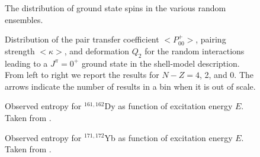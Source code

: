 \documentclass[preprint,rmp,aps,floatfix]{revtex4}
\begin{document}
\begin{figure}
\caption{The distribution of ground state spins in the various
random ensembles.}
\label{fig:j0s}
\end{figure}

\begin{figure}
\caption{Distribution of the pair transfer coefficient $<\!\!P^+_{00}\!\!>$,
pairing strength $<\!\!\kappa\!\!>$, and deformation $Q_2$ for the random 
interactions
leading to a $J^\pi=0^+$ ground state in the shell-model description.
From left to right we report the results for $N-Z=4$, 2, and 0. The arrows
indicate the number of results in a bin when it is out of scale.}
\label{kfig4}
\end{figure}

\begin{figure}
\caption{Observed entropy for $^{161,162}$Dy as 
function of excitation energy $E$. Taken from \cite{entropy2000}.}
\label{fig:fig7_sec3}
\end{figure}
\begin{figure}
\caption{Observed entropy for $^{171,172}$Yb as function 
of excitation energy $E$. Taken from \cite{entropy2000}.}
\label{fig:fig8_sec3}
\end{figure}
\end{document}
